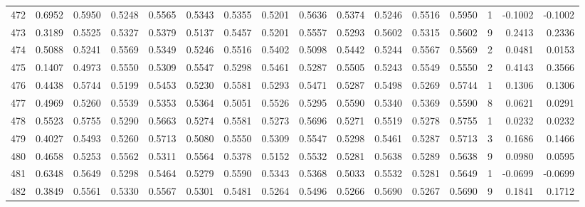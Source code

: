 \begin{tabular}{lrrrrrrrrrrrrrrr}
472 &      0.6952 &  0.5950 &  0.5248 &  0.5565 &  0.5343 &  0.5355 &  0.5201 &  0.5636 &  0.5374 &  0.5246 &   0.5516 &     0.5950 &      1 &                   -0.1002 &                    -0.1002 \\
473 &      0.3189 &  0.5525 &  0.5327 &  0.5379 &  0.5137 &  0.5457 &  0.5201 &  0.5557 &  0.5293 &  0.5602 &   0.5315 &     0.5602 &      9 &                    0.2413 &                     0.2336 \\
474 &      0.5088 &  0.5241 &  0.5569 &  0.5349 &  0.5246 &  0.5516 &  0.5402 &  0.5098 &  0.5442 &  0.5244 &   0.5567 &     0.5569 &      2 &                    0.0481 &                     0.0153 \\
475 &      0.1407 &  0.4973 &  0.5550 &  0.5309 &  0.5547 &  0.5298 &  0.5461 &  0.5287 &  0.5505 &  0.5243 &   0.5549 &     0.5550 &      2 &                    0.4143 &                     0.3566 \\
476 &      0.4438 &  0.5744 &  0.5199 &  0.5453 &  0.5230 &  0.5581 &  0.5293 &  0.5471 &  0.5287 &  0.5498 &   0.5269 &     0.5744 &      1 &                    0.1306 &                     0.1306 \\
477 &      0.4969 &  0.5260 &  0.5539 &  0.5353 &  0.5364 &  0.5051 &  0.5526 &  0.5295 &  0.5590 &  0.5340 &   0.5369 &     0.5590 &      8 &                    0.0621 &                     0.0291 \\
478 &      0.5523 &  0.5755 &  0.5290 &  0.5663 &  0.5274 &  0.5581 &  0.5273 &  0.5696 &  0.5271 &  0.5519 &   0.5278 &     0.5755 &      1 &                    0.0232 &                     0.0232 \\
479 &      0.4027 &  0.5493 &  0.5260 &  0.5713 &  0.5080 &  0.5550 &  0.5309 &  0.5547 &  0.5298 &  0.5461 &   0.5287 &     0.5713 &      3 &                    0.1686 &                     0.1466 \\
480 &      0.4658 &  0.5253 &  0.5562 &  0.5311 &  0.5564 &  0.5378 &  0.5152 &  0.5532 &  0.5281 &  0.5638 &   0.5289 &     0.5638 &      9 &                    0.0980 &                     0.0595 \\
481 &      0.6348 &  0.5649 &  0.5298 &  0.5464 &  0.5279 &  0.5590 &  0.5343 &  0.5368 &  0.5033 &  0.5532 &   0.5281 &     0.5649 &      1 &                   -0.0699 &                    -0.0699 \\
482 &      0.3849 &  0.5561 &  0.5330 &  0.5567 &  0.5301 &  0.5481 &  0.5264 &  0.5496 &  0.5266 &  0.5690 &   0.5267 &     0.5690 &      9 &                    0.1841 &                     0.1712 \\

\end{tabular}
